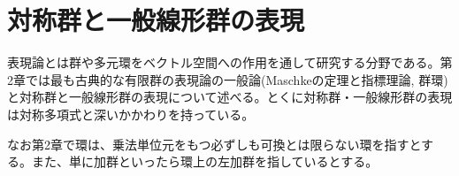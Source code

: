 \documentclass{ltjsreport}
\begin{document}
\chapter{対称群と一般線形群の表現}

表現論とは群や多元環をベクトル空間への作用を通して研究する分野である。第2章では最も古典的な有限群の表現論の一般論(Maschkeの定理と指標理論, 群環)と対称群と一般線形群の表現について述べる。とくに対称群・一般線形群の表現は対称多項式と深いかかわりを持っている。

なお第2章で環は、乗法単位元をもつ必ずしも可換とは限らない環を指すとする。また、単に加群といったら環上の左加群を指しているとする。




\newpage



\newpage


\newpage

\end{document}
